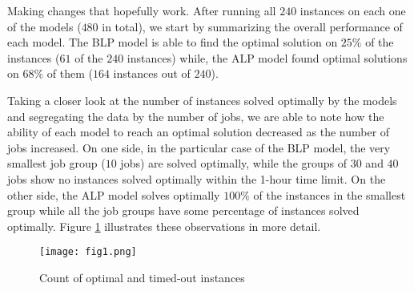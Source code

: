 Making changes that hopefully work.
After running all $240$ instances on each one of the models ($480$ in total), we start by summarizing the overall performance of each model. The BLP model is able to find the optimal solution on $25\%$ of the instances ($61$ of the $240$ instances) while, the ALP model found optimal solutions on $68\%$ of them ($164$ instances out of $240$).

Taking a closer look at the number of instances solved optimally by the models and segregating the data by the number of jobs, we are able to note how the ability of each model to reach an optimal solution decreased as the number of jobs increased. On one side, in the particular case of the BLP model, the very smallest job group ($10$ jobs) are solved optimally, while the groups of $30$ and $40$ jobs show no instances solved optimally within the 1-hour time limit. On the other side, the ALP model solves optimally $100\%$ of the instances in the smallest group while all the job groups have some percentage of instances solved optimally. Figure \ref{fig:f1} illustrates these observations in more detail.
\begin{figure}[h!]
\caption{Count of optimal and timed-out instances}
\label{fig:f1}
\centering
\texttt{[image: fig1.png]}
\end{figure}

